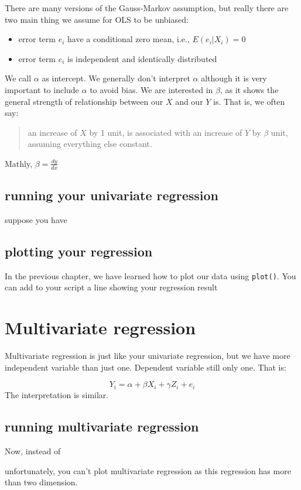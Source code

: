 \documentclass[
]{book}
\providecommand{\tightlist}{%
  \setlength{\itemsep}{0pt}\setlength{\parskip}{0pt}}
\begin{document}
There are many versions of the Gauss-Markov assumption, but really there are two main thing we assume for OLS to be unbiased:

\begin{itemize}
\tightlist
\item
  error term \(e_i\) have a conditional zero mean, i.e., \(E(e_i|X_i)=0\)
\item
  error term \(e_i\) is independent and identically distributed
\end{itemize}

We call \(\alpha\) as intercept. We generally don't interpret \(\alpha\) although it is very important to include \(\alpha\) to avoid bias. We are interested in \(\beta\), as it shows the general strength of relationship between our \(X\) and our \(Y\) is. That is, we often say:

\begin{quote}
an increase of \(X\) by 1 unit, is associated with an increase of \(Y\) by \(\beta\) unit, assuming everything else constant.
\end{quote}

Mathly, \(\beta=\frac{dy}{dx}\)

\hypertarget{running-your-univariate-regression}{%
\subsection{running your univariate regression}\label{running-your-univariate-regression}}

suppose you have

\hypertarget{plotting-your-regression}{%
\subsection{plotting your regression}\label{plotting-your-regression}}

In the previous chapter, we have learned how to plot our data using \texttt{plot()}. You can add to your script a line showing your regression result

\hypertarget{multivariate-regression}{%
\section{Multivariate regression}\label{multivariate-regression}}

Multivariate regression is just like your univariate regression, but we have more independent variable than just one. Dependent variable still only one. That is:

\[
Y_i=\alpha+\beta X_i+\gamma Z_i+ e_i
\]
The interpretation is similar.

\hypertarget{running-multivariate-regression}{%
\subsection{running multivariate regression}\label{running-multivariate-regression}}

Now, instead of

unfortunately, you can't plot multivariate regression as this regression has more than two dimension.

  
\end{document}
